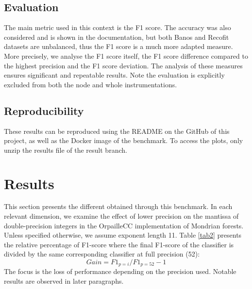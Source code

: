 \documentclass[conference]{IEEEtran}
\begin{document}
\subsection{Evaluation}
The main metric used in this context is the F1 score. The accuracy was also considered and is shown in the documentation, but both Banos and Recofit datasets are unbalanced, thus the F1 score is a much more adapted measure. More precisely, we analyse the F1 score itself, the F1 score difference compared to the highest precision and the F1 score deviation. The analysis of these measures ensures significant and repeatable results. Note the evaluation is explicitly excluded from both the node and whole instrumentations.
\subsection{Reproducibility}
These results can be reproduced using the README on the GitHub of this project, as well as the Docker image of the benchmark. To access the plots, only unzip the results file of the result branch.

\section{Results}
This section presents the different obtained through this benchmark. In each relevant dimension, we examine the effect of lower precision on the mantissa of double-precision integers in the OrpailleCC implementation of Mondrian forests. Unless specified otherwise, we assume exponent length 11. Table \ref{tab2} presents the relative percentage of F1-score where the final F1-score of the classifier is divided by the same corresponding classifier at full precision (52):
\begin{equation}
Gain = F1_{p=i} / F1_{p=52}-1 \label{eq3}
\end{equation}
The focus is the loss of performance depending on the precision used. Notable results are observed in later paragraphs.
\end{document}
